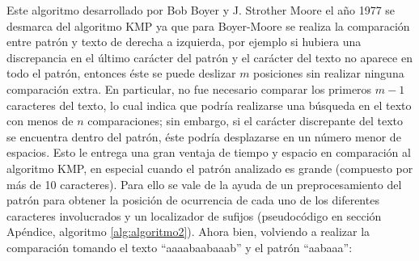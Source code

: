 Este algoritmo desarrollado por Bob Boyer y J. Strother Moore el año 1977 se desmarca del algoritmo KMP ya que para Boyer-Moore se realiza la comparación entre patrón y texto de derecha a izquierda, por ejemplo si hubiera una discrepancia en el último carácter del patrón y el carácter del texto no aparece en todo el patrón, entonces éste se puede deslizar $m$ posiciones sin realizar ninguna comparación extra. En particular, no fue necesario comparar los primeros $m-1$ caracteres del texto, lo cual indica que podría realizarse una búsqueda en el texto con menos de $n$ comparaciones; sin embargo, si el carácter discrepante del texto se encuentra dentro del patrón, éste podría desplazarse en un número menor de espacios\cite{boyermoore}. Esto le entrega una gran ventaja de tiempo y espacio en comparación al algoritmo KMP, en especial cuando el patrón analizado es grande (compuesto por más de 10 caracteres). Para ello se vale de la ayuda de un preprocesamiento del patrón para obtener la posición de ocurrencia de cada uno de los diferentes caracteres involucrados y un localizador de sufijos (pseudocódigo en sección Apéndice, algoritmo \ref{alg:algoritmo2}). Ahora bien, volviendo a realizar la comparación tomando el texto ``aaaabaabaaab'' y el patrón ``aabaaa'': 

